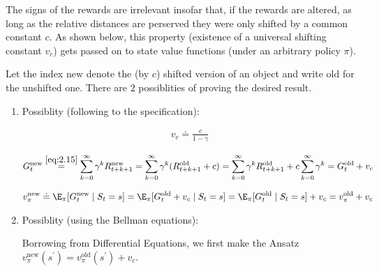 \begin{solution}

The signs of the rewards are irrelevant insofar that, if the rewards are altered, as long as the relative distances are perserved they were only shifted by a common constant $c$.
As shown below, this property (existence of a universal shifting constant $v_c$) gets passed on to state value functions (under an arbitrary policy $\pi$).

Let the index $\text{new}$ denote the (by $c$) shifted version of an object and write $\text{old}$ for the unshifted one.
There are $2$ possiblities of proving the desired result.

\begin{enumerate}[label = \arabic*.]

    \item Possiblity (following to the specification):
    
    \begin{align*}
        v_c \doteq \frac{c}{1 - \gamma}
    \end{align*}
    
    \begin{align*}
        G_t^\text{new}
        \stackrel
        {
            \eqref{eq:2.15}
        }{=}
        \sum_{k=0}^\infty
            \gamma^k R_{t+k+1}^\text{new}
        =
        \sum_{k=0}^\infty
            \gamma^k (R_{t+k+1}^\text{old} + c)
        =
        \sum_{k=0}^\infty
            \gamma^k R_{t+k+1}^\text{old}
        +
        c
        \sum_{k=0}^\infty
            \gamma^k
        =
        G_t^\text{old} + v_c
    \end{align*}

    \begin{align*}
        v_\pi^\text{new}
        \doteq
        \E_\pi[G_t^\text{new} \mid S_t = s]
        =
        \E_\pi[G_t^\text{old} + v_c \mid S_t = s]
        =
        \E_\pi[G_t^\text{old} \mid S_t = s] + v_c
        =
        v_\pi^\text{old} + v_c
    \end{align*}

    \item Possiblity (using the Bellman equations):
    
    Borrowing from Differential Equations, we first make the Ansatz $v_\pi^\text{new}(s^\prime) = v_\pi^\text{old}(s^\prime) + v_c$.


\end{enumerate}
\end{solution}
